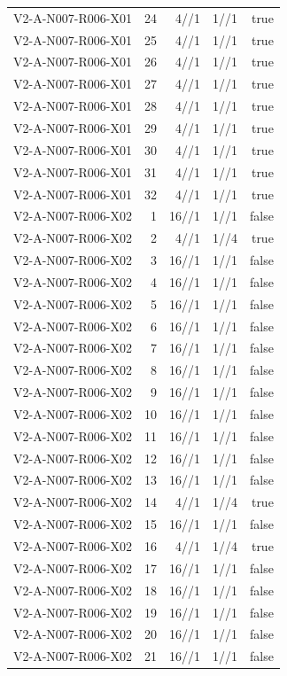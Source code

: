 {\begin{longtable}{lrrrr}
V2-A-N007-R006-X01 & 24 & 4//1 & 1//1 & true \\
V2-A-N007-R006-X01 & 25 & 4//1 & 1//1 & true \\
V2-A-N007-R006-X01 & 26 & 4//1 & 1//1 & true \\
V2-A-N007-R006-X01 & 27 & 4//1 & 1//1 & true \\
V2-A-N007-R006-X01 & 28 & 4//1 & 1//1 & true \\
V2-A-N007-R006-X01 & 29 & 4//1 & 1//1 & true \\
V2-A-N007-R006-X01 & 30 & 4//1 & 1//1 & true \\
V2-A-N007-R006-X01 & 31 & 4//1 & 1//1 & true \\
V2-A-N007-R006-X01 & 32 & 4//1 & 1//1 & true \\
V2-A-N007-R006-X02 & 1 & 16//1 & 1//1 & false \\
V2-A-N007-R006-X02 & 2 & 4//1 & 1//4 & true \\
V2-A-N007-R006-X02 & 3 & 16//1 & 1//1 & false \\
V2-A-N007-R006-X02 & 4 & 16//1 & 1//1 & false \\
V2-A-N007-R006-X02 & 5 & 16//1 & 1//1 & false \\
V2-A-N007-R006-X02 & 6 & 16//1 & 1//1 & false \\
V2-A-N007-R006-X02 & 7 & 16//1 & 1//1 & false \\
V2-A-N007-R006-X02 & 8 & 16//1 & 1//1 & false \\
V2-A-N007-R006-X02 & 9 & 16//1 & 1//1 & false \\
V2-A-N007-R006-X02 & 10 & 16//1 & 1//1 & false \\
V2-A-N007-R006-X02 & 11 & 16//1 & 1//1 & false \\
V2-A-N007-R006-X02 & 12 & 16//1 & 1//1 & false \\
V2-A-N007-R006-X02 & 13 & 16//1 & 1//1 & false \\
V2-A-N007-R006-X02 & 14 & 4//1 & 1//4 & true \\
V2-A-N007-R006-X02 & 15 & 16//1 & 1//1 & false \\
V2-A-N007-R006-X02 & 16 & 4//1 & 1//4 & true \\
V2-A-N007-R006-X02 & 17 & 16//1 & 1//1 & false \\
V2-A-N007-R006-X02 & 18 & 16//1 & 1//1 & false \\
V2-A-N007-R006-X02 & 19 & 16//1 & 1//1 & false \\
V2-A-N007-R006-X02 & 20 & 16//1 & 1//1 & false \\
V2-A-N007-R006-X02 & 21 & 16//1 & 1//1 & false \\

\end{longtable}}
